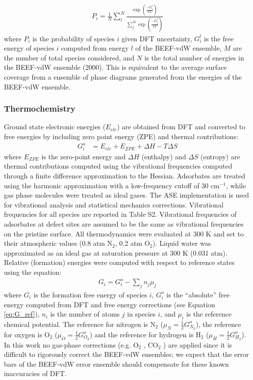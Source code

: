 \documentclass[journal=ascecg,manuscript=article,articletitle=true]{achemso}
\begin{document}
\begin{align}
	P_i = \frac{1}{N}\sum_{l} ^{N} \frac{\exp(\frac{-G_i^l}{kT})}{\sum_{j} ^{M}\exp(\frac{-G^l_j}{kT})}
	\label{eq:prob}
\end{align}
where $P_i$ is the probability of species $i$ given DFT uncertainty, $G_i^l$ is the free energy of species $i$ computed from energy $l$ of the BEEF-vdW ensemble, $M$ are the number of total species considered, and $N$ is the total number of energies in the BEEF-vdW ensemble (2000). This is equivalent to the average surface coverage from a ensemble of phase diagrams generated from the energies of the BEEF-vdW ensemble. 

\subsubsection{Thermochemistry}

Ground state electronic energies ($E_{ele}$) are obtained from DFT and converted to free energies by including zero point energy (ZPE) and thermal contributions:
\begin{align}
	G_i^o &= E_{ele} + E_{ZPE} +  \Delta H - T \Delta S \label{eq:G_ref}
\end{align}
where $E_{ZPE}$ is the zero-point energy and $\Delta H$ (enthalpy) and $\Delta S$ (entropy) are thermal contributions computed using the vibrational frequencies computed through a finite difference approximation to the Hessian. Adsorbates are treated using the harmonic approximation with a low-frequency cutoff of 30 cm$^{-1}$, while gas phase molecules were treated as ideal gases. The ASE implementation \cite{ISI:000175131400009} is used for vibrational analysis and statistical mechanics corrections. Vibrational frequencies for all species are reported in Table S2. Vibrational frequencies of adsorbates at defect sites are assumed to be the same as vibrational frequencies on the pristine surface. All thermodynamics were evaluated at 300 K and set to their atmospheric values (0.8 atm N$_2$, 0.2 atm O$_2$). Liquid water was approximated as an ideal gas at saturation pressure at 300 K (0.031 atm). Relative (formation) energies were computed with respect to reference states using the equation:
\begin{align}
	G_i = G_i^o - \sum_j n_j \mu_j\label{eq:G_sum}
\end{align}
where $G_i$ is the formation free energy of species $i$, $G_i^o$ is the ``absolute'' free energy computed from DFT and free energy corrections (see Equation \ref{eq:G_ref}), $n_i$ is the number of atoms $j$ in species $i$, and $\mu_i$ is the reference chemical potential. The reference for nitrogen is N$_2$ ($\mu_N = \frac{1}{2} G_{N_2}^o$), the reference for oxygen is O$_2$ ($\mu_O = \frac{1}{2} G_{O_2}^o$) and the reference for hydrogen is H$_2$ ($\mu_H = \frac{1}{2} G_{H_2}^o$). In this work no gas-phase corrections (e.g. O$_2$ \cite{Norskov_2004}, CO$_2$ \cite{Peterson_2010}) are applied since it is difficult to rigorously correct the BEEF-vdW ensembles; we expect that the error bars of the BEEF-vdW error ensemble should compensate for these known inaccuracies of DFT.
\end{document}
